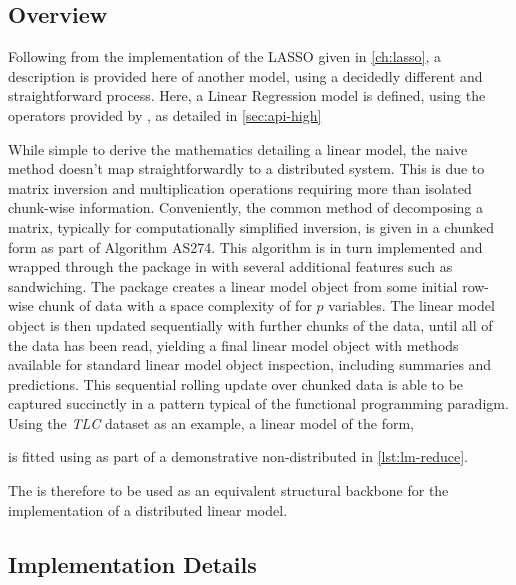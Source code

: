 \subsection{Overview}

Following from the implementation of the LASSO given in \cref{ch:lasso}, a description is provided here of another model, using a decidedly different and straightforward process.
Here, a Linear Regression model is defined, using the operators provided by \lso{}, as detailed in \cref{sec:api-high}

While simple to derive the mathematics detailing a linear model, the naive method doesn't map straightforwardly to a distributed system.
This is due to matrix inversion and multiplication operations requiring more than isolated chunk-wise information.
Conveniently, the common method of decomposing a matrix, typically for computationally simplified inversion, is given in a chunked form as part of Algorithm AS274\cite{miller1992as274}.
This algorithm is in turn implemented and wrapped through the  package in \R{} with several additional features such as sandwiching\cite{lumley2013biglm}.
The  package creates a linear model object from some initial row-wise chunk of data with a space complexity of  for $p$ variables.
The linear model object is then updated sequentially with further chunks of the data, until all of the data has been read, yielding a final linear model object with methods available for standard linear model object inspection, including summaries and predictions.
This sequential rolling update over chunked data is able to be captured succinctly in a  pattern typical of the functional programming paradigm.
Using the \textit{TLC} dataset as an example, a linear model of the form,


is fitted using  as part of a demonstrative non-distributed  in \cref{lst:lm-reduce}.


The  is therefore to be used as an equivalent structural backbone for the implementation of a distributed linear model.

\subsection{Implementation Details}

